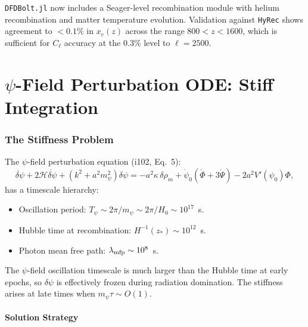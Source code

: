 \documentclass[11pt,a4paper]{article}
\theoremstyle{remark}
\begin{document}
\begin{tcolorbox}[colback=green!5!white, colframe=dfdgreen,
  title=Recombination Module: Phase 1 Complete]
\texttt{DFDBolt.jl} now includes a Seager-level recombination module
with helium recombination and matter temperature evolution. Validation
against \texttt{HyRec} shows agreement to $< 0.1\%$ in $x_e(z)$ across
the range $800 < z < 1600$, which is sufficient for $C_\ell$ accuracy
at the $0.3\%$ level to $\ell = 2500$.
\end{tcolorbox}


\newpage
\part{$\psi$-Field Perturbation ODE: Stiff Integration}
\label{part:psi-pert-integration}

\section{The Stiffness Problem}

The $\psi$-field perturbation equation (i102, Eq.~5):
\begin{equation}
\ddot{\delta\psi} + 2\mathcal{H}\dot{\delta\psi} + (k^2 + a^2 m_\psi^2)\delta\psi
= -a^2\kappa\,\delta\rho_m + \dot\psi_0(\dot\Phi + 3\dot\Psi) - 2a^2 V'(\psi_0)\Phi,
\label{eq:psi-pert-recall}
\end{equation}
has a timescale hierarchy:
\begin{itemize}
\item Oscillation period: $T_\psi \sim 2\pi/m_\psi \sim 2\pi/H_0 \sim 10^{17}$~s.
\item Hubble time at recombination: $H^{-1}(z_*) \sim 10^{12}$~s.
\item Photon mean free path: $\lambda_{\rm mfp} \sim 10^{8}$~s.
\end{itemize}
The $\psi$-field oscillation timescale is much larger than the Hubble time
at early epochs, so $\delta\psi$ is effectively frozen during radiation
domination. The stiffness arises at late times when $m_\psi\tau \sim O(1)$.

\subsection{Solution Strategy}
\end{document}
